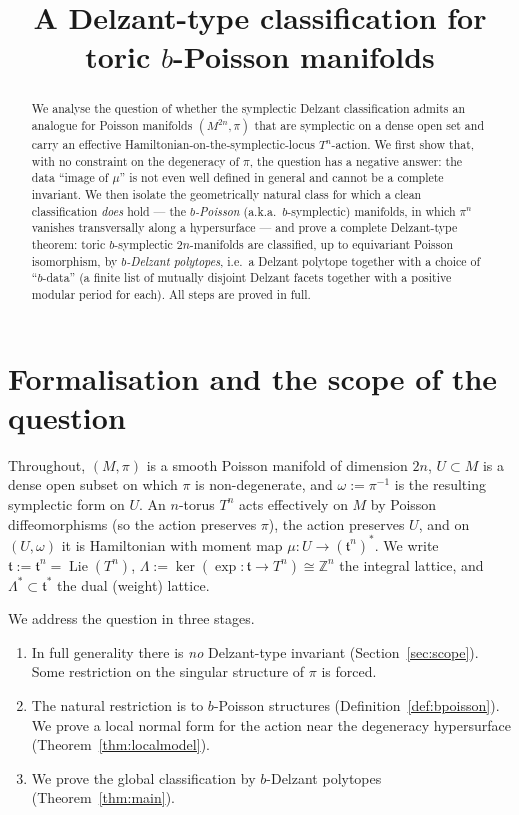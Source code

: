 \documentclass{amsart}
\theoremstyle{definition}
\begin{document}
\title{A Delzant-type classification for toric $b$-Poisson manifolds}
\maketitle

\begin{abstract}
We analyse the question of whether the symplectic Delzant classification
admits an analogue for Poisson manifolds $(M^{2n},\pi)$ that are symplectic
on a dense open set and carry an effective Hamiltonian-on-the-symplectic-locus
$T^n$-action. We first show that, with no constraint on the degeneracy of
$\pi$, the question has a negative answer: the data ``image of $\mu$'' is not
even well defined in general and cannot be a complete invariant. We then
isolate the geometrically natural class for which a clean classification
\emph{does} hold --- the \emph{$b$-Poisson} (a.k.a.\ $b$-symplectic) manifolds,
in which $\pi^n$ vanishes transversally along a hypersurface --- and prove a
complete Delzant-type theorem: toric $b$-symplectic $2n$-manifolds are
classified, up to equivariant Poisson isomorphism, by \emph{$b$-Delzant
polytopes}, i.e.\ a Delzant polytope together with a choice of
``$b$-data'' (a finite list of mutually disjoint Delzant facets together with a
positive modular period for each). All steps are proved in full.
\end{abstract}

\section{Formalisation and the scope of the question}

Throughout, $(M,\pi)$ is a smooth Poisson manifold of dimension $2n$, $U\subset
M$ is a dense open subset on which $\pi$ is non-degenerate, and $\omega:=\pi^{-1}$
is the resulting symplectic form on $U$. An $n$-torus $T^n$ acts effectively on
$M$ by Poisson diffeomorphisms (so the action preserves $\pi$), the action
preserves $U$, and on $(U,\omega)$ it is Hamiltonian with moment map
$\mu\colon U\to(\mathfrak t^n)^*$. We write $\mathfrak t:=\mathfrak t^n=\operatorname{Lie}(T^n)$,
$\Lambda:=\ker(\exp\colon\mathfrak t\to T^n)\cong\mathbb Z^n$ the integral
lattice, and $\Lambda^*\subset\mathfrak t^*$ the dual (weight) lattice.

We address the question in three stages.
\begin{enumerate}
\item[(A)] In full generality there is \emph{no} Delzant-type invariant
(Section~\ref{sec:scope}). Some restriction on the singular structure of $\pi$
is forced.
\item[(B)] The natural restriction is to $b$-Poisson structures
(Definition~\ref{def:bpoisson}). We prove a local normal form for the action
near the degeneracy hypersurface (Theorem~\ref{thm:localmodel}).
\item[(C)] We prove the global classification by $b$-Delzant polytopes
(Theorem~\ref{thm:main}).
\end{enumerate}
\end{document}
